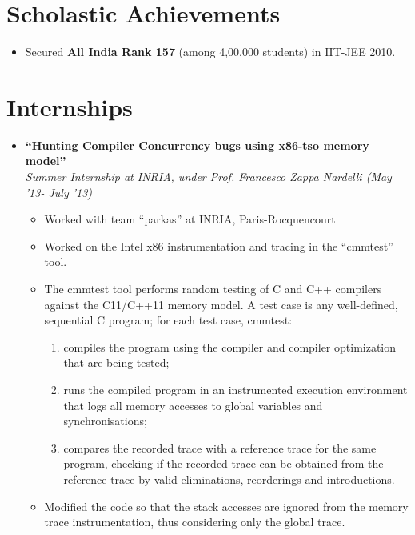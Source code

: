 \documentclass[margin,line]{resume}
\begin{document}
\begin{resume}
  \section{\mysidestyle Scholastic Achievements}
  \begin{itemize}
  \item Secured \textbf{\textsf{All India Rank 157}} (among 4,00,000 students) in IIT-JEE 2010.
  \end{itemize}

  \section{\mysidestyle Internships}
  \begin{itemize}
  \item \large{\textbf{\textsf{``Hunting Compiler Concurrency bugs using x86-tso memory model''}}}
    \\ \small{\textit{Summer Internship at INRIA, under Prof. Francesco Zappa Nardelli (May '13- July '13)}}
    \normalsize
    \begin{itemize}
    \item Worked with team ``parkas'' at INRIA, Paris-Rocquencourt
    \item Worked on the Intel x86 instrumentation and tracing in the ``cmmtest'' tool. 
    \item The cmmtest tool performs random testing of C and C++ compilers against the C11/C++11 memory model. A test case is any well-defined, sequential C program; for each test case, cmmtest:
      \begin{enumerate}
      \item compiles the program using the compiler and compiler optimization that are being tested;
      \item runs the compiled program in an instrumented execution environment that logs all memory accesses to global variables and synchronisations;
      \item compares the recorded trace with a reference trace for the same program, checking if the recorded trace can be obtained from the reference trace by valid eliminations, reorderings and introductions.
      \end{enumerate}
      \item Modified the code so that the stack accesses are ignored from the memory trace instrumentation, thus considering only the global trace.

\end{itemize}
\end{itemize}
\end{resume}
\end{document}

